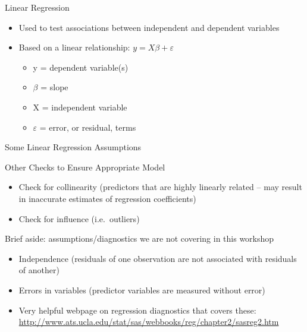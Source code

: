 \documentclass[ignorenonframetext,xcolor=dvipsnames]{beamer}
\begin{document}
\begin{frame}{Linear Regression}

\begin{itemize}
\item
  Used to test associations between independent and dependent variables
\item
  Based on a linear relationship: \(y = X\beta + \varepsilon\)

  \begin{itemize}
  \itemsep1pt\parskip0pt
  \item
    y = dependent variable(s)
  \item
    \(\beta\) = slope
  \item
    X = independent variable
  \item
    \(\varepsilon\) = error, or residual, terms
  \end{itemize}
\end{itemize}

\end{frame}

\begin{frame}{Some Linear Regression Assumptions}


\end{frame}

\begin{frame}{Other Checks to Ensure Appropriate Model}

\begin{itemize}
\item
  Check for collinearity (predictors that are highly linearly related --
  may result in inaccurate estimates of regression coefficients)
\item
  Check for influence (i.e.~outliers)
\end{itemize}

\end{frame}

\begin{frame}{Brief aside: assumptions/diagnostics we are not covering
in this workshop}

\begin{itemize}
\item
  Independence (residuals of one observation are not associated with
  residuals of another)
\item
  Errors in variables (predictor variables are measured without error)
\item
  Very helpful webpage on regression diagnostics that covers these:
  \url{http://www.ats.ucla.edu/stat/sas/webbooks/reg/chapter2/sasreg2.htm}
\end{itemize}

\end{frame}
\end{document}
